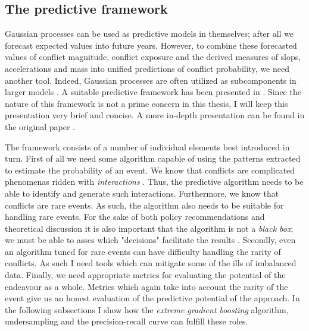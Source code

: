 \documentclass[a4paper]{article}
\begin{document}
\subsection{The predictive framework}


Gaussian processes can be used as predictive models in themselves; after all we forecast expected values into future years. However, to combine these forecasted values of conflict magnitude, conflict exposure and the derived measures of slops, accelerations and mass into unified predictions of conflict probability, we need another tool. Indeed, Gaussian processes are often utilized as subcomponents in larger models \citep[505]{Gelman_2013}. A suitable predictive framework has been presented in \cite{Maase}. Since the nature of this framework is not a prime concern in this thesis, I will keep this presentation very brief and concise. A more in-depth presentation can be found in the original paper \citep[9-12]{Maase}.\par %

The framework consists of a number of individual elements best introduced in turn. First of all we need some algorithm capable of using the patterns extracted to estimate the probability of an event. We know that conflicts are complicated phenomenas ridden with \emph{interactions} \citep[474]{cederman2017predicting}. Thus, the predictive algorithm needs to be able to identify and generate such interactions. Furthermore, we know that conflicts are rare events. As such, the algorithm also needs to be suitable for handling rare events. For the sake of both policy recommendations and theoretical discussion it is also important that the algorithm is not a \emph{black box}; we must be able to asses which "decisions" facilitate the results \cite[476]{cederman2017predicting}. Secondly, even an algorithm tuned for rare events can have difficulty handling the rarity of conflicts. As such I need tools which can mitigate some of the ills of imbalanced data. Finally, we need appropriate metrics for evaluating the potential of the endeavour as a whole. Metrics which again take into account the rarity of the event give us an honest evaluation of the predictive potential of the approach. In the following subsections I show how the \emph{extreme gradient boosting} algorithm, undersampling and the precision-recall curve can fulfill these roles.\par
\end{document}
